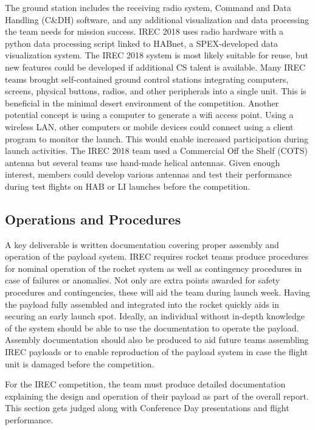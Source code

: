 \documentclass[conference]{IEEEtran} %
\begin{document}
The ground station includes the receiving radio system, Command and Data Handling (C\&DH) software, and any additional visualization and data processing the team needs for mission success. IREC 2018 uses radio hardware with a python data processing script linked to HABnet, a SPEX-developed data visualization system. The IREC 2018 system is most likely suitable for reuse, but new features could be developed if additional CS talent is available. Many IREC teams brought self-contained ground control stations integrating computers, screens, physical buttons, radios, and other peripherals into a single unit. This is beneficial in the minimal desert environment of the competition. Another potential concept is using a computer to generate a wifi access point. Using a wireless LAN, other computers or mobile devices could connect using a client program to monitor the launch. This would enable increased participation during launch activities. The IREC 2018 team used a Commercial Off the Shelf (COTS) antenna but several teams use hand-made helical antennas. Given enough interest, members could develop various antennas and test their performance during test flights on HAB or LI launches before the competition. 

\subsection{Operations and Procedures}
\label{subsec:opsproc}

A key deliverable is written documentation covering proper assembly and operation of the payload system. IREC requires rocket teams produce procedures for nominal operation of the rocket system as well as contingency procedures in case of failures or anomalies. Not only are extra points awarded for safety procedures and contingencies, these will aid the team during launch week. Having the payload fully assembled and integrated into the rocket quickly aids in securing an early launch spot. Ideally, an individual without in-depth knowledge of the system should be able to use the documentation to operate the payload. Assembly documentation should also be produced to aid future teams assembling IREC payloads or to enable reproduction of the payload system in case the flight unit is damaged before the competition.

For the IREC competition, the team must produce detailed documentation explaining the design and operation of their payload as part of the overall report. This section gets judged along with Conference Day presentations and flight performance.
\end{document}

